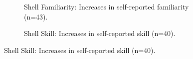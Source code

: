 \documentclass[10pt, twocolumn]{article}
\begin{document}
\begin{figure}
\centering
\begin{subfigure}[t]{0.47\columnwidth}
	\centering
	\caption{Shell Familiarity: Increases in self-reported familiarity (n=43).	\label{shellFamiliarity}}

\end{subfigure}
\begin{subfigure}[t]{0.47\columnwidth}
	\centering
	\caption{Shell Skill: Increases in self-reported skill (n=40). 	\label{shellSkill}}


\end{subfigure}
\end{figure}
\end{document}
